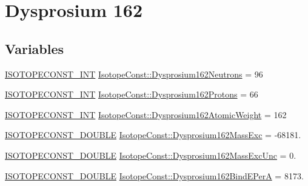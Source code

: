 \hypertarget{group___isotope_const-_dysprosium-_dy162}{}\section{Dysprosium 162}
\label{group___isotope_const-_dysprosium-_dy162}
\subsection*{Variables}
\begin{DoxyCompactItemize}
\item 
\mbox{\hyperlink{group___isotope_const-_macros_ga5f18360b3e99483a35c32d789e62621c}{I\+S\+O\+T\+O\+P\+E\+C\+O\+N\+S\+T\+\_\+\+I\+NT}} \mbox{\hyperlink{group___isotope_const-_dysprosium-_dy162_ga64d6d3d8c60a970cf505605e2805bd37}{Isotope\+Const\+::\+Dysprosium162\+Neutrons}} = 96
\item 
\mbox{\hyperlink{group___isotope_const-_macros_ga5f18360b3e99483a35c32d789e62621c}{I\+S\+O\+T\+O\+P\+E\+C\+O\+N\+S\+T\+\_\+\+I\+NT}} \mbox{\hyperlink{group___isotope_const-_dysprosium-_dy162_ga507af844f796a9606ee172f5047881e5}{Isotope\+Const\+::\+Dysprosium162\+Protons}} = 66
\item 
\mbox{\hyperlink{group___isotope_const-_macros_ga5f18360b3e99483a35c32d789e62621c}{I\+S\+O\+T\+O\+P\+E\+C\+O\+N\+S\+T\+\_\+\+I\+NT}} \mbox{\hyperlink{group___isotope_const-_dysprosium-_dy162_gabbe185bc43119447f3986660de18ba2e}{Isotope\+Const\+::\+Dysprosium162\+Atomic\+Weight}} = 162
\item 
\mbox{\hyperlink{group___isotope_const-_macros_ga8f45a7272ce02c0b4c65c44636ed719a}{I\+S\+O\+T\+O\+P\+E\+C\+O\+N\+S\+T\+\_\+\+D\+O\+U\+B\+LE}} \mbox{\hyperlink{group___isotope_const-_dysprosium-_dy162_ga7773fd834aa1e6f548bb2cb2919ce1fb}{Isotope\+Const\+::\+Dysprosium162\+Mass\+Exc}} = -\/68181.
\item 
\mbox{\hyperlink{group___isotope_const-_macros_ga8f45a7272ce02c0b4c65c44636ed719a}{I\+S\+O\+T\+O\+P\+E\+C\+O\+N\+S\+T\+\_\+\+D\+O\+U\+B\+LE}} \mbox{\hyperlink{group___isotope_const-_dysprosium-_dy162_ga5cd6d3d1192470947bc39bd9908f042e}{Isotope\+Const\+::\+Dysprosium162\+Mass\+Exc\+Unc}} = 0.
\item 
\mbox{\hyperlink{group___isotope_const-_macros_ga8f45a7272ce02c0b4c65c44636ed719a}{I\+S\+O\+T\+O\+P\+E\+C\+O\+N\+S\+T\+\_\+\+D\+O\+U\+B\+LE}} \mbox{\hyperlink{group___isotope_const-_dysprosium-_dy162_ga5bbd590d819690abfd1289d73d3d5808}{Isotope\+Const\+::\+Dysprosium162\+Bind\+E\+PerA}} = 8173.

\end{DoxyCompactItemize}
